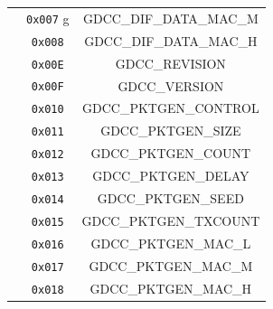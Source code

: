 \begin{table}[H]
\begin{tabular}{|c|c|c|}
                   & \texttt{0x007} g& GDCC\_DIF\_DATA\_MAC\_M \\
                   & \texttt{0x008} & GDCC\_DIF\_DATA\_MAC\_H \\
                   & \texttt{0x00E} & GDCC\_REVISION \\
                   & \texttt{0x00F} & GDCC\_VERSION \\
                   & \texttt{0x010} & GDCC\_PKTGEN\_CONTROL \\
                   & \texttt{0x011} & GDCC\_PKTGEN\_SIZE \\
                   & \texttt{0x012} & GDCC\_PKTGEN\_COUNT \\
                   & \texttt{0x013} & GDCC\_PKTGEN\_DELAY \\
                   & \texttt{0x014} & GDCC\_PKTGEN\_SEED \\
                   & \texttt{0x015} & GDCC\_PKTGEN\_TXCOUNT \\
                   & \texttt{0x016} & GDCC\_PKTGEN\_MAC\_L \\
                   & \texttt{0x017} &  GDCC\_PKTGEN\_MAC\_M \\
                   & \texttt{0x018} & GDCC\_PKTGEN\_MAC\_H \\
    \hline
  \end{tabular}
  \egroup
\end{table}


\printbibliography


